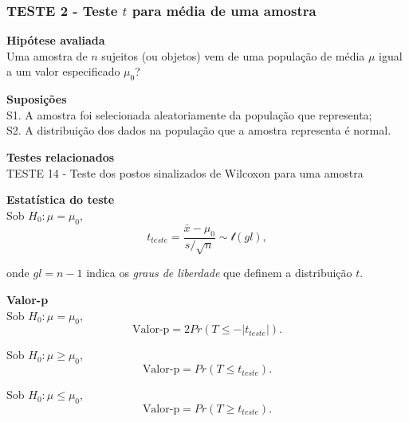 \documentclass[
]{book}
\theoremstyle{definition}
\theoremstyle{definition}
\theoremstyle{definition}
\theoremstyle{remark}
\begin{document}
\hypertarget{teste-2---teste-t-para-muxe9dia-de-uma-amostra}{%
\subsubsection*{\texorpdfstring{TESTE 2 - Teste \(t\) para média de uma amostra}{TESTE 2 - Teste t para média de uma amostra}}\label{teste-2---teste-t-para-muxe9dia-de-uma-amostra}}

\textbf{Hipótese avaliada}\\
Uma amostra de \(n\) sujeitos (ou objetos) vem de uma população de média \(\mu\) igual a um valor especificado \(\mu_0\)?

\textbf{Suposições}\\
S1. A amostra foi selecionada aleatoriamente da população que representa;\\
S2. A distribuição dos dados na população que a amostra representa é normal.

\textbf{Testes relacionados}\\
TESTE 14 - Teste dos postos sinalizados de Wilcoxon para uma amostra

\textbf{Estatística do teste}\\
Sob \(H_0: \mu = \mu_0\),
\begin{equation}
t_{teste}=\frac{\bar{x}-\mu_0}{s/\sqrt{n}} \sim \mathcal{t}(gl),
\label{eq:t-teste-media-uni}
\end{equation}

onde \(gl=n-1\) indica os \emph{graus de liberdade} que definem a distribuição \(t\).

\textbf{Valor-p}\\
Sob \(H_0: \mu = \mu_0\),
\begin{equation}
\text{Valor-p} = 2Pr(T \le -|t_{teste}|).
\label{eq:t-teste-media-uni-p-bi}
\end{equation}

Sob \(H_0: \mu \ge \mu_0\),
\begin{equation}
\text{Valor-p} = Pr(T \le t_{teste}).
\label{eq:t-teste-media-uni-p-uni-inf}
\end{equation}

Sob \(H_0: \mu \le \mu_0\),
\begin{equation}
\text{Valor-p} = Pr(T \ge t_{teste}).
\label{eq:t-teste-media-uni-p-uni-sup}
\end{equation}
\end{document}

